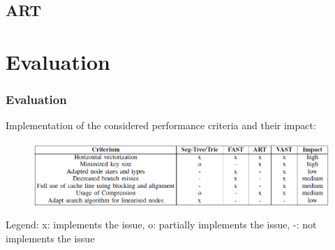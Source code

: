 \documentclass{beamer}
\begin{document}
\subsection{ART}
\section{Evaluation}


\begin{frame}
\frametitle{Evaluation}
Implementation of the considered performance criteria and their impact:
\begin{figure}
	\includegraphics[width=1.05\textwidth]{img/table_eval.png}
\end{figure}
Legend: x: implements the issue, o: partially implements the issue, -: not implements the issue
\end{frame}
\end{document}
